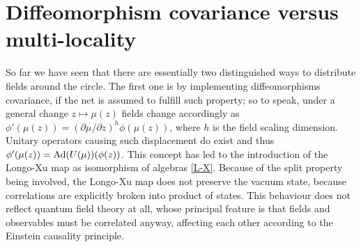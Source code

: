 \section{Diffeomorphism covariance versus multi-locality}
\label{connections with gauge}
So far we have seen that there are essentially two 
distinguished ways to distribute fields around the circle. The
first one is by implementing diffeomorphisms 
covariance, if the net is assumed to fulfill such
property; so to speak, under a general change 
$z\mapsto \mu(z)$ fields change accordingly as 
$\phi'(\mu(z))=(\partial \mu/\partial z)^h\phi(\mu(z))$,
where $h$ is the field scaling dimension. Unitary
operators causing such displacement do exist and
thus $\phi'(\mu(z))=\operatorname{Ad} (U(\mu))(\phi(z))$. This
concept has led \cite{LX:2004} to the introduction
of the Longo-Xu map as isomorphism of algebras
\eqref{L-X}. Because of the split property being involved, 
the Longo-Xu map does not preserve the vacuum state,
because correlations are explicitly broken into 
product of states. This behaviour does not reflect 
quantum field theory at all, whose 
principal feature is that fields and observables 
must be correlated anyway, affecting each other 
according to the Einstein causality principle.

